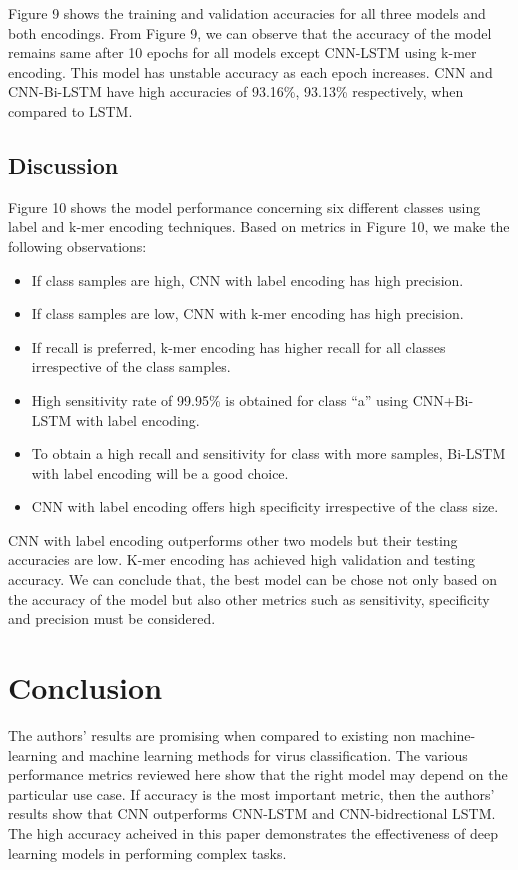 \documentclass[journal]{IEEEtran}
\begin{document}
    Figure 9 shows the training and validation accuracies for all three models and both encodings. 
    From Figure 9, we can observe that the accuracy of the model remains same after 10 epochs for all models 
    except CNN-LSTM using k-mer encoding. This model has unstable accuracy as each epoch increases.
    CNN and CNN-Bi-LSTM have high accuracies of 93.16\%, 93.13\% respectively, when compared to LSTM.

    \subsection{Discussion}
      Figure 10 shows the model performance  concerning six different classes using label and k-mer encoding techniques. 
      Based on metrics in Figure 10, we make the following observations:
      \begin{itemize}
        \item If class samples are high, CNN with label encoding has high precision.
        \item If class samples are low, CNN with k-mer encoding has high precision.
        \item If recall is preferred, k-mer encoding has higher recall for all classes irrespective of the class samples.  
        \item High sensitivity rate of 99.95\% is obtained for class “a” using CNN+Bi-LSTM with label encoding.
        \item To obtain a high recall and sensitivity for class with more samples, Bi-LSTM with label encoding will be a good choice.
        \item CNN with label encoding offers high specificity irrespective of the class size.
      \end{itemize}
      CNN with label encoding outperforms other two models but their testing accuracies are low. 
      K-mer encoding has achieved high validation and testing accuracy. 
      We can conclude that, the best model can be chose not only based on the accuracy of the model 
      but also other metrics such as sensitivity, specificity and precision must be considered.
    
\section{Conclusion}
  The authors' results are promising when compared to existing non machine-learning and machine learning methods for
  virus classification. The various performance metrics reviewed here show that the right model may depend on the
  particular use case. If accuracy is the most important metric, then the authors' results show that CNN outperforms
  CNN-LSTM and CNN-bidrectional LSTM. The high accuracy acheived in this paper demonstrates the effectiveness of 
  deep learning models in performing complex tasks.
\end{document}
